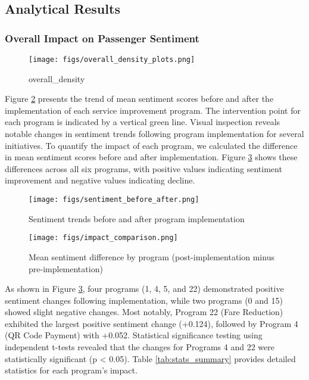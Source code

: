 \documentclass[a4paper,fleqn,12pt]{cas-sc}
\begin{document}
\subsection{Analytical Results}

\subsubsection{Overall Impact on Passenger Sentiment}

\begin{figure}[h]
\centering
\texttt{[image: figs/overall\_density\_plots.png]}
\caption{overall_density}
\label{fig:impact_comparison}
\end{figure}

Figure \ref{fig:sentiment_before_after} presents the trend of mean sentiment scores before and after the implementation of each service improvement program. The intervention point for each program is indicated by a vertical green line. Visual inspection reveals notable changes in sentiment trends following program implementation for several initiatives. To quantify the impact of each program, we calculated the difference in mean sentiment scores before and after implementation. Figure \ref{fig:impact_comparison} shows these differences across all six programs, with positive values indicating sentiment improvement and negative values indicating decline.

\begin{figure}[h]
\centering
\texttt{[image: figs/sentiment\_before\_after.png]}
\caption{Sentiment trends before and after program implementation}
\label{fig:sentiment_before_after}
\end{figure}

\begin{figure}[h]
\centering
\texttt{[image: figs/impact\_comparison.png]}
\caption{Mean sentiment difference by program (post-implementation minus pre-implementation)}
\label{fig:impact_comparison}
\end{figure}

As shown in Figure \ref{fig:impact_comparison}, four programs (1, 4, 5, and 22) demonstrated positive sentiment changes following implementation, while two programs (0 and 15) showed slight negative changes. Most notably, Program 22 (Fare Reduction) exhibited the largest positive sentiment change (+0.124), followed by Program 4 (QR Code Payment) with +0.052. Statistical significance testing using independent t-tests revealed that the changes for Programs 4 and 22 were statistically significant (p < 0.05). Table \ref{tab:stats_summary} provides detailed statistics for each program's impact.
\end{document}
